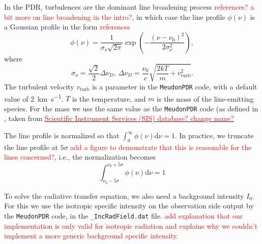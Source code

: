 \documentclass[12pt,a4paper]{article}
\newcommand{\mr}{\mathrm}
\newcommand{\dd}[1]{\mathrm{d}#1}
\newcommand{\mdpdr}{\texttt{MeudonPDR} code}
\newcommand{\qt}[1]{\textcolor{red}{#1}}
\begin{document}
In the PDR, turbulences are the dominant line broadening process \qt{references?  a bit more on line broadening in the intro?}, in which case the line profile $\phi(\nu)$ is a Gaussian profile in the form \qt{references}
\begin{equation}
    \phi(\nu) = \frac{1}{\sigma_\nu \sqrt{2 \pi}}\exp\left({-\frac{(\nu - \nu_0)^2}{2 \sigma_\nu^2}}\right),
\end{equation}
where
\begin{equation}
    \sigma_\nu = \frac{\sqrt{2}}{2}\Delta \nu_D,\,\Delta \nu_D = \frac{\nu_0}{c}\sqrt{\frac{2 k T}{m} + v_\mr{turb}^2}.
\end{equation}
The turbulent velocity $v_\mr{turb}$ is a parameter in the \mdpdr{}, with a default value of \qty{2}{\km\per\second}. $T$ is the temperature, and $m$ is the mass of the line-emitting species. For the mass we use the same value as the \mdpdr{} (as defined in , taken from \href{https://www.sisweb.com/referenc/source/exactmas.htm}{\qt{Scientific Instrument Services (SIS) database? change name?}}

The line profile is normalized so that $\int_0^{\infty} \phi(\nu) \dd{\nu} = 1$. In practice, we truncate the line profile at $5\sigma$ \qt{add a figure to demonstrate that this is reasonable for the lines concerned?}, i.e., the normalization becomes
\begin{equation}
    \int_{\nu_0 - 5\sigma}^{\nu_0 + 5\sigma}\phi(\nu) \dd{\nu} = 1
\end{equation}

To solve the radiative transfer equation, we also need a background intensity $I_0$. For this we use the isotropic specific intensity on the observation side output by the \mdpdr{}, in the \texttt{_IncRadField.dat} file. 
\qt{add explanation that our implementation is only valid for isotropic radiation and explains why we couldn't implement a more generic background specific intensity.}
\end{document}
